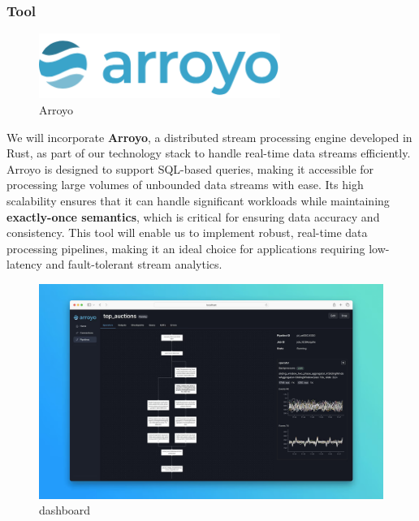 \documentclass[12pt, a4paper]{article}
\begin{document}
        \subsubsection{Tool }
        \begin{figure}[H]
            \centering
            \includegraphics[width=0.7\textwidth]{Images/arroyo.png}
            \vspace{1em}
            \caption{Arroyo}
        \end{figure}
        We will incorporate \textbf{Arroyo}, a distributed stream processing engine developed in Rust, as part of our technology stack to handle real-time data streams efficiently. Arroyo is designed to support SQL-based queries, making it accessible for processing large volumes of unbounded data streams with ease. Its high scalability ensures that it can handle significant workloads while maintaining \textbf{exactly-once semantics}, which is critical for ensuring data accuracy and consistency. This tool will enable us to implement robust, real-time data processing pipelines, making it an ideal choice for applications requiring low-latency and fault-tolerant stream analytics.
        \begin{figure}[H]
            \centering
            \includegraphics[width=\textwidth]{Images/tool-dash.png}
            \vspace{1em}
            \caption{dashboard}
        \end{figure}
\end{document}
